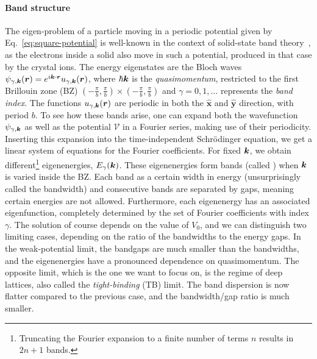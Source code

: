\paragraph{Band structure}
The eigen-problem of a particle moving in a periodic potential given
by Eq.~\eqref{eq:square-potential} is well-known in the context of
solid-state band theory~\cite{ziman1972principles}, as the electrons
inside a solid also move in such a potential, produced in that case by
the crystal ions. The energy eigenstates are the Bloch waves
$\psi_{\gamma,\bm{k}}(\bm{r}) = e^{i\bm{k}\cdot\bm{r}} u_{\gamma,\bm{k}}(\bm{r})$, where
$\hbar \bm{k}$ is the \textit{quasimomentum}, restricted to the first
Brillouin zone (BZ)
$\left(-\frac{\pi}{b}, \frac{\pi}{b}\right) \times
\left(-\frac{\pi}{b}, \frac{\pi}{b}\right)$ and $\gamma = 0,1,\dots$
represents the \textit{band index}. The functions
$u_{\gamma,\bm{k}}(\bm{r})$ are periodic in both the $\hat{\bm{x}}$ and
$\hat{\bm{y}}$ direction, with period $b$. To see how these bands
arise, one can expand both the wavefunction $\psi_{\gamma,\bm{k}}$ as
well as the potential $\mathcal{V}$ in a Fourier series, making use of
their periodicity. Inserting this expansion into the time-independent
Schr\"odinger equation, we get a linear system of equations for the
Fourier coefficients. For fixed $\bm{k}$, we obtain
different\footnote{Truncating the Fourier expansion to a finite number
  of terms $n$ results in $2n+1$ bands.} eigenenergies,
$E_{\gamma}(\bm{k})$. These eigenenergies form bands (called ) when $\bm{k}$ is varied inside the BZ. Each band as a certain
width in energy (unsurprisingly called the bandwidth) and consecutive
bands are separated by gaps, meaning certain energies are not
allowed. Furthermore, each eigenenergy has an associated
eigenfunction, completely determined by the set of Fourier
coefficients with index $\gamma$. The solution of course depends on
the value of $V_0$, and we can distinguish two limiting cases,
depending on the ratio of the bandwidths to the energy gaps. In the
weak-potential limit, the bandgaps are much smaller than the
bandwidths, and the eigenenergies have a pronounced dependence on
quasimomentum. The opposite limit, which is the one we want to focus
on, is the regime of deep lattices, also called the
\textit{tight-binding} (TB) limit. The band dispersion is now flatter
compared to the previous case, and the bandwidth/gap ratio is much
smaller.

